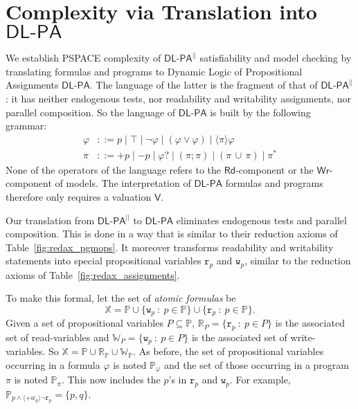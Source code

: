 \documentclass{llncs}
\newcommand{\atm}{x}
\newcommand{\atmb}{y}
\newcommand{\atmset}{\mathtt{\mathbb X}}	%
\newcommand{\pll}{ {||} }							%
\newcommand{\readOf}[1]{\mathbb{R}_{#1}}
\newcommand{\readable}[1]{\mathtt{r}_{#1}}
\newcommand{\readset}{\mathsf{Rd}}
\newcommand{\valuset}{\mathsf{V}}
\newcommand{\writable}[1]{\mathtt{w}_{#1}}
\newcommand{\writeset}{\mathsf{Wr}}
\newcommand{\testendo}{?\!\!?}			%
\newcommand{\testpdl}{?}				%
\newcommand{\writeOf}[1]{\mathbb{W}_{#1}}
\newcommand{\Dlpa}{\ensuremath{\mathsf{DL\text{-}PA}}\xspace}
\newcommand{\DlpaPll}{\ensuremath{\mathsf{DL\text{-}PA}^\pll}\xspace}
\newcommand{\assgntopR}[1]{{\mathtt r {+} #1}}
\newcommand{\assgnbotR}[1]{{\mathtt r {-} #1}}
\newcommand{\assgntopW}[1]{{\mathtt w {+} #1}}
\newcommand{\assgnbotW}[1]{{\mathtt w {-} #1}}
\newcommand{\assgntopV}[1]{{\mathtt {+} #1}}
\newcommand{\assgnbotV}[1]{{\mathtt {-} #1}}
\newcommand{\ldia}[1]{ \big\langle #1 \big\rangle}
\newcommand{\ndet}{\,{\cup}\,}
\renewcommand{\phi}{\varphi}
\newcommand{\propset}{\mathbb P}
\newcommand{\propsetOf}[1]{\propset_{#1}}
\newcommand{\suchthat}{~ : ~}
\begin{document}
\section{Complexity via Translation into \Dlpa}\label{sec:complexity}

We establish PSPACE complexity of \DlpaPll satisfiability and model checking by translating formulas and programs to 
Dynamic Logic of Propositional Assignments \Dlpa. 
The language of the latter is the fragment of that of \DlpaPll:
it has neither endogenous tests, nor readability and writability assignments, nor parallel composition. 
So the language of \Dlpa is built by the following grammar: 
\begin{align*}
\phi & ::= p \mid \top \mid \lnot \phi \mid (\phi \lor \phi) \mid \ldia \pi \phi
\\
\pi & ::= \assgntopV p \mid \assgnbotV p \mid
			\phi \testpdl \mid 
			(\pi ; \pi) \mid (\pi \ndet \pi) \mid 
			\pi^\ast 
\end{align*} 
None of the operators of the language refers to the $\readset$-component or the $\writeset$-component of models. 
The interpretation of \Dlpa formulas and programs therefore only requires a valuation $\valuset$. 

Our translation from \DlpaPll to \Dlpa eliminates endogenous tests and parallel composition. 
This is done in a way that is similar to their reduction axioms of Table~\ref{fig:redax_pgmops}.
It moreover transforms readability and writability statements into special propositional variables $\readable p$ and $\writable p$, similar to the reduction axioms of Table~\ref{fig:redax_assignments}.

To make this formal, let the set of \emph{atomic formulas} be
$$ \atmset = \propset \cup \{ \writable{p} \suchthat p \in \propset \} \cup \{ \readable p \suchthat p \in \propset \} . $$
Given a set of propositional variables $P \subseteq \propset$, 
$\readOf P = \{ \readable p \suchthat p \in P \}$ 
is the associated set of read-variables and 
$\writeOf P = \{ \writable{p} \suchthat p \in P \}$ 
is the associated set of write-variables. 
So $\atmset = \propset \cup \readOf \propset \cup \writeOf \propset$. 
%
As before, the set of propositional variables occurring in a formula $\phi$ is noted $\propsetOf \phi $ and 
the set of those occurring in a program $\pi$ is noted $\propsetOf \pi $. %
This now includes the $p$'s in $\readable p$ and $\writable{p}$. 
For example, $\propsetOf{ p \land \ldia{\assgntopV{w_q} } \lnot \readable p } = \{p,q\}$. %
\end{document}

